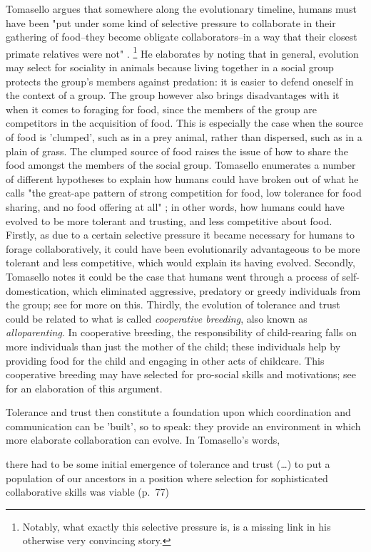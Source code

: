 Tomasello argues that somewhere along the evolutionary timeline, humans must have been "put under some kind of selective pressure to collaborate in their gathering of food--they become obligate collaborators--in a way that their closest primate relatives were not" \citep[p.~75]{Tomasello09}.
\footnote{Notably, what exactly this selective pressure is, is a missing link in his otherwise very convincing story.}
He elaborates by noting that in general, evolution may select for sociality in animals because living together in a social group protects the group's members against predation: it is easier to defend oneself in the context of a group. The group however also brings disadvantages with it when it comes to foraging for food, since the members of the group are competitors in the acquisition of food. This is especially the case when the source of food is 'clumped', such as in a prey animal, rather than dispersed, such as in a plain of grass. The clumped source of food raises the issue of how to share the food amongst the members of the social group.
Tomasello enumerates a number of different hypotheses to explain how humans could have broken out of what he calls "the great-ape pattern of strong competition for food, low tolerance for food sharing, and no food offering at all" \citep[p.~83]{Tomasello09}; in other words, how humans could have evolved to be more tolerant and trusting, and less competitive about food.
Firstly, as due to a certain selective pressure it became necessary for humans to forage collaboratively, it could have been evolutionarily advantageous to be more tolerant and less competitive, which would explain its having evolved.
Secondly, Tomasello notes it could be the case that humans went through a process of self-domestication, which eliminated aggressive, predatory or greedy individuals from the group; see \citet{Benitez21} for more on this.
Thirdly, the evolution of tolerance and trust could be related to what is called \emph{cooperative breeding}, also known as \emph{alloparenting}. In cooperative breeding, the responsibility of child-rearing falls on more individuals than just the mother of the child; these individuals help by providing food for the child and engaging in other acts of childcare. This cooperative breeding may have selected for pro-social skills and motivations; see \citet{Hrdy09} for an elaboration of this argument.

Tolerance and trust then constitute a foundation upon which coordination and communication can be 'built', so to speak: they provide an environment in which more elaborate collaboration can evolve. In Tomasello's words,
\begin{quoting}
    there had to be some initial emergence of tolerance and trust (\ldots) to put a population of our ancestors in a position where selection for sophisticated collaborative skills was viable
    \hfill (p.~77)
\end{quoting}

